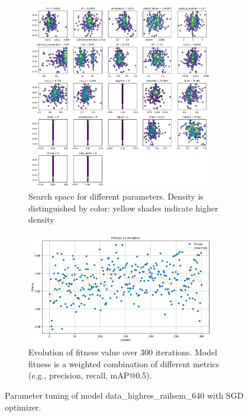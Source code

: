 \documentclass[Master,MDS,english]{BASE/twbook} %
\begin{document}
\begin{figure}
\centering
\begin{subfigure}[t]{.5\textwidth}
  \centering
  \includegraphics[width=0.9\textwidth]{images/yolo/highres/sgd/tune_scatter_plots}
  \caption{Search space for different parameters. Density is distinguished by color: yellow shades indicate higher density}
\end{subfigure}%
\begin{subfigure}[t]{.5\textwidth}
  \centering
  \includegraphics[width=0.9\textwidth]{images/yolo/highres/sgd/tune_fitness}
  \caption{Evolution of fitness value over 300 iterations. Model fitness is a weighted combination of different metrics (e.g., precision, recall, mAP@0.5).}
  \label{fig:images_from_videos}
\end{subfigure}
\caption{Parameter tuning of model data\_highres\_railsem\_640 with SGD optimizer. \\ }
\label{fig:yolo_tune_highres_sgd}
\end{figure}
\end{document}
